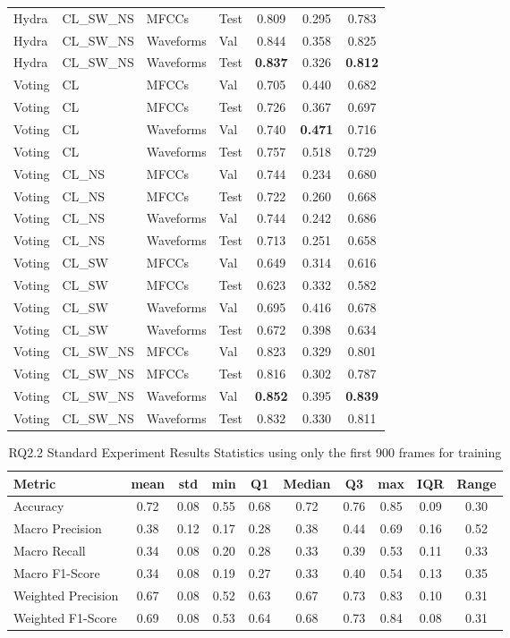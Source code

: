 \begin{longtable}{|l|l|l|l|c|c|c|}
Hydra & CL\_SW\_NS & MFCCs & Test & 0.809 & 0.295 & 0.783 \\
Hydra & CL\_SW\_NS & Waveforms & Val & 0.844 & 0.358 & 0.825 \\
Hydra & CL\_SW\_NS & Waveforms & Test & \textbf{0.837} & 0.326 & \textbf{0.812} \\
Voting & CL & MFCCs & Val & 0.705 & 0.440 & 0.682 \\
Voting & CL & MFCCs & Test & 0.726 & 0.367 & 0.697 \\
Voting & CL & Waveforms & Val & 0.740 & \textbf{0.471} & 0.716 \\
Voting & CL & Waveforms & Test & 0.757 & 0.518 & 0.729 \\
Voting & CL\_NS & MFCCs & Val & 0.744 & 0.234 & 0.680 \\
Voting & CL\_NS & MFCCs & Test & 0.722 & 0.260 & 0.668 \\
Voting & CL\_NS & Waveforms & Val & 0.744 & 0.242 & 0.686 \\
Voting & CL\_NS & Waveforms & Test & 0.713 & 0.251 & 0.658 \\
Voting & CL\_SW & MFCCs & Val & 0.649 & 0.314 & 0.616 \\
Voting & CL\_SW & MFCCs & Test & 0.623 & 0.332 & 0.582 \\
Voting & CL\_SW & Waveforms & Val & 0.695 & 0.416 & 0.678 \\
Voting & CL\_SW & Waveforms & Test & 0.672 & 0.398 & 0.634 \\
Voting & CL\_SW\_NS & MFCCs & Val & 0.823 & 0.329 & 0.801 \\
Voting & CL\_SW\_NS & MFCCs & Test & 0.816 & 0.302 & 0.787 \\
Voting & CL\_SW\_NS & Waveforms & Val & \textbf{0.852} & 0.395 & \textbf{0.839} \\
Voting & CL\_SW\_NS & Waveforms & Test & 0.832 & 0.330 & 0.811 \\
\end{longtable}

\begin{table}[h]
\caption{RQ2.2 Standard Experiment Results Statistics using only the first 900 frames for training}
\label{tab:rq2.2_900_Standard_Results_Statistics}
\begin{tabular}{|l|c|c|c|c|c|c|c|c|c|}
\toprule
Metric & mean & std & min & Q1 & Median & Q3 & max & IQR & Range \\
\midrule
Accuracy & 0.72 & 0.08 & 0.55 & 0.68 & 0.72 & 0.76 & 0.85 & 0.09 & 0.30 \\
Macro Precision & 0.38 & 0.12 & 0.17 & 0.28 & 0.38 & 0.44 & 0.69 & 0.16 & 0.52 \\
Macro Recall & 0.34 & 0.08 & 0.20 & 0.28 & 0.33 & 0.39 & 0.53 & 0.11 & 0.33 \\
Macro F1-Score & 0.34 & 0.08 & 0.19 & 0.27 & 0.33 & 0.40 & 0.54 & 0.13 & 0.35 \\
Weighted Precision & 0.67 & 0.08 & 0.52 & 0.63 & 0.67 & 0.73 & 0.83 & 0.10 & 0.31 \\
Weighted F1-Score & 0.69 & 0.08 & 0.53 & 0.64 & 0.68 & 0.73 & 0.84 & 0.08 & 0.31 \\
\bottomrule
\end{tabular}
\end{table}